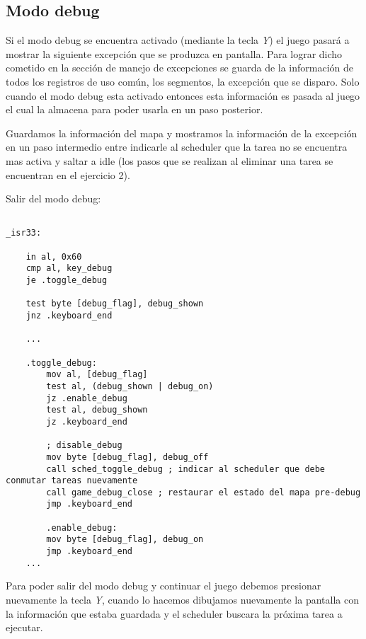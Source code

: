 	\subsection{Modo debug}
	Si el modo debug se encuentra activado (mediante la tecla \textit{Y}) el juego pasará a mostrar la siguiente excepción que se produzca en pantalla. Para lograr dicho cometido en la sección de manejo de excepciones se guarda de la información de todos los registros de uso común, los segmentos, la excepción que se disparo. Solo cuando el modo debug esta activado entonces esta información es pasada al juego el cual la almacena para poder usarla en un paso posterior.

	Guardamos la información del mapa y mostramos la información de la excepción en un paso intermedio entre indicarle al scheduler que la tarea no se encuentra mas activa y saltar a idle (los pasos que se realizan al eliminar una tarea se encuentran en el ejercicio 2).

	Salir del modo debug:

	\begin{lstlisting}

_isr33:

    in al, 0x60
    cmp al, key_debug
    je .toggle_debug

    test byte [debug_flag], debug_shown
    jnz .keyboard_end

    ...

    .toggle_debug:
        mov al, [debug_flag]
        test al, (debug_shown | debug_on)
        jz .enable_debug
        test al, debug_shown
        jz .keyboard_end

        ; disable_debug
        mov byte [debug_flag], debug_off
        call sched_toggle_debug ; indicar al scheduler que debe conmutar tareas nuevamente
        call game_debug_close ; restaurar el estado del mapa pre-debug
        jmp .keyboard_end

        .enable_debug:
        mov byte [debug_flag], debug_on
        jmp .keyboard_end
    ...
	\end{lstlisting}

	Para poder salir del modo debug y continuar el juego debemos presionar nuevamente la tecla \textit{Y}, cuando lo hacemos dibujamos nuevamente la pantalla con la información que estaba guardada y el scheduler buscara la próxima tarea a ejecutar.